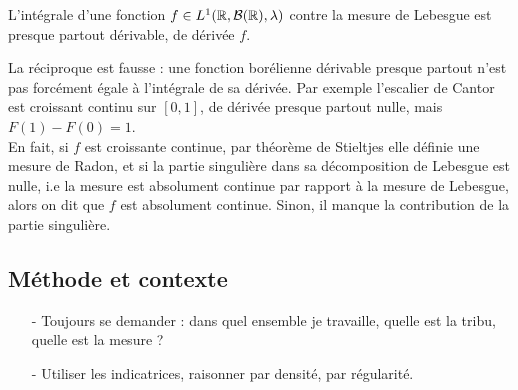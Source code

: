 \documentclass[11pt,a4paper]{article}
\begin{document}
\begin{cor}
L'intégrale d'une fonction $f \in L^1(\mathbb R,\mathcal{B}(\mathbb R),\lambda)$ contre la mesure de Lebesgue est presque partout dérivable, de dérivée $f$.
\end{cor}

\begin{rmq}
La réciproque est fausse : une fonction borélienne dérivable presque partout n'est pas forcément égale à l'intégrale de sa dérivée. Par exemple l'escalier de Cantor est croissant continu sur $[0,1]$, de dérivée presque partout nulle, mais $F(1)-F(0)=1$. \\
En fait, si $f$ est croissante continue, par théorème de Stieltjes elle définie une mesure de Radon, et si la partie singulière dans sa décomposition de Lebesgue est nulle, i.e la mesure est absolument continue par rapport à la mesure de Lebesgue, alors on dit que $f$ est absolument continue. Sinon, il manque la contribution de la partie singulière.
\end{rmq}


\subsection*{Méthode et contexte}

\begin{itemize}
\item[-] Toujours se demander : dans quel ensemble je travaille, quelle est la tribu, quelle est la mesure ? 
\item[-] Utiliser les indicatrices, raisonner par densité, par régularité.
\end{itemize}
\end{document}
